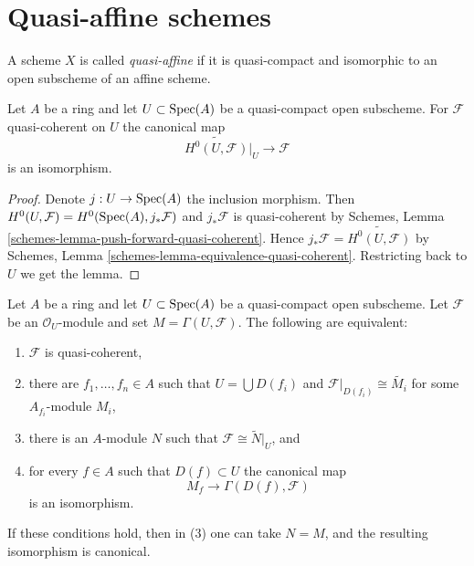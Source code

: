 \section{Quasi-affine schemes}
\label{section-quasi-affine}

\begin{definition}
\label{definition-quasi-affine}
A scheme $X$ is called {\it quasi-affine} if it is quasi-compact
and isomorphic to an open subscheme of an affine scheme.
\end{definition}

\begin{lemma}
\label{lemma-quasi-coherent-quasi-affine}
Let $A$ be a ring and let $U \subset \mathop{\mathrm{Spec}}(A)$ be a quasi-compact
open subscheme. For $\mathcal{F}$ quasi-coherent on $U$ the canonical map
$$
\widetilde{H^0(U, \mathcal{F})}|_U \to \mathcal{F}
$$
is an isomorphism.
\end{lemma}

\begin{proof}
Denote $j : U \to \mathop{\mathrm{Spec}}(A)$ the inclusion morphism. Then
$H^0(U, \mathcal{F}) = H^0(\mathop{\mathrm{Spec}}(A), j_*\mathcal{F})$ and
$j_*\mathcal{F}$ is quasi-coherent by
Schemes, Lemma \ref{schemes-lemma-push-forward-quasi-coherent}.
Hence $j_*\mathcal{F} = \widetilde{H^0(U, \mathcal{F})}$ by
Schemes, Lemma \ref{schemes-lemma-equivalence-quasi-coherent}.
Restricting back to $U$ we get the lemma.
\end{proof}

\begin{lemma}
\label{lemma-characterize-quasi-coherent-quasi-affine}
\begin{reference}
\cite[I, Theorem 1.4.1]{EGA1}
\end{reference}
Let $A$ be a ring and let $U \subset \mathop{\mathrm{Spec}}(A)$ be a quasi-compact open
subscheme. Let $\mathcal{F}$ be an $\mathcal{O}_U$-module and set
$M = \Gamma(U, \mathcal{F})$. The following are equivalent:
\begin{enumerate}
\item $\mathcal{F}$ is quasi-coherent,
\item there are $f_1, \ldots, f_n \in A$ such that
$U = \bigcup D(f_i)$ and
$\mathcal{F}|_{D(f_i)} \cong \widetilde{M_i}$ for some
$A_{f_i}$-module $M_i$,
\item there is an $A$-module $N$ such that
$\mathcal{F} \cong \widetilde N|_U$, and
\item for every $f \in A$ such that $D(f) \subset U$ the canonical map
$$
M_f \longrightarrow \Gamma(D(f), \mathcal{F})
$$
is an isomorphism.
\end{enumerate}
If these conditions hold, then in (3) one can take $N = M$, and the
resulting isomorphism is canonical.
\end{lemma}

